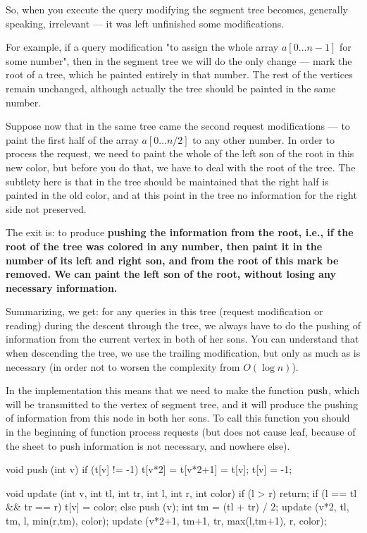 So, when you execute the query modifying the segment tree becomes, generally speaking, irrelevant --- it was left unfinished some modifications.

For example, if a query modification "to assign the whole array $a[0 \ldots n-1]$ for some number", then in the segment tree we will do the only change --- mark the root of a tree, which he painted entirely in that number. The rest of the vertices remain unchanged, although actually the tree should be painted in the same number.

Suppose now that in the same tree came the second request modifications --- to paint the first half of the array $a[0 \ldots n/2]$ to any other number. In order to process the request, we need to paint the whole of the left son of the root in this new color, but before you do that, we have to deal with the root of the tree. The subtlety here is that in the tree should be maintained that the right half is painted in the old color, and at this point in the tree no information for the right side not preserved.

The exit is: to produce \bf{pushing} the information from the root, i.e., if the root of the tree was colored in any number, then paint it in the number of its left and right son, and from the root of this mark be removed. We can paint the left son of the root, without losing any necessary information.

Summarizing, we get: for any queries in this tree (request modification or reading) during the descent through the tree, we always have to do the pushing of information from the current vertex in both of her sons. You can understand that when descending the tree, we use the trailing modification, but only as much as is necessary (in order not to worsen the complexity from $O (\log n)$).

In the implementation this means that we need to make the function $\rm push$, which will be transmitted to the vertex of segment tree, and it will produce the pushing of information from this node in both her sons. To call this function you should in the beginning of function process requests (but does not cause leaf, because of the sheet to push information is not necessary, and nowhere else).

\code
void push (int v) {
if (t[v] != -1) {
t[v*2] = t[v*2+1] = t[v];
t[v] = -1;
}
}

void update (int v, int tl, int tr, int l, int r, int color) {
if (l > r)
return;
if (l == tl && tr == r)
t[v] = color;
else {
push (v);
int tm = (tl + tr) / 2;
update (v*2, tl, tm, l, min(r,tm), color);
update (v*2+1, tm+1, tr, max(l,tm+1), r, color);
}
}

